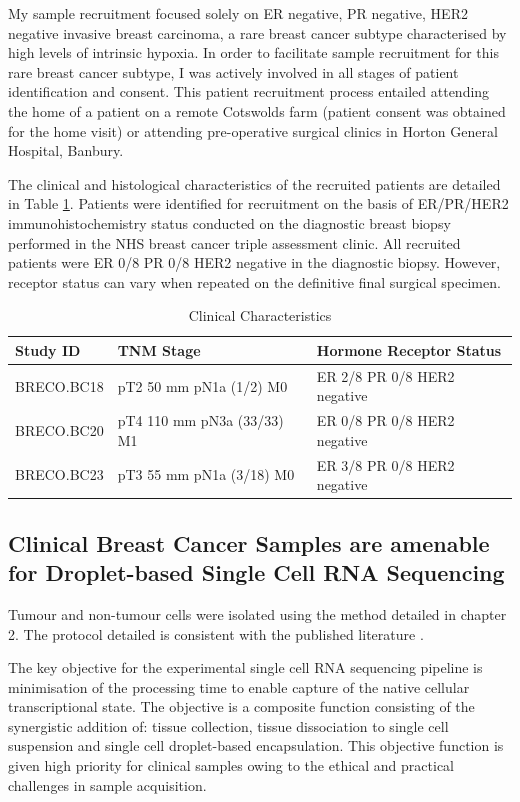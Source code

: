 My sample recruitment focused solely on ER negative, PR negative, HER2 negative invasive breast carcinoma, a rare breast cancer subtype characterised by high levels of intrinsic hypoxia. In order to facilitate sample recruitment for this rare breast cancer subtype, I was actively involved in all stages of patient identification and consent. This patient recruitment process entailed attending the home of a patient on a remote Cotswolds farm (patient consent was obtained for the home visit) or attending pre-operative surgical clinics in Horton General Hospital, Banbury.


The clinical and histological characteristics of the recruited patients are detailed in Table \ref{tab: clinical_characteristics}. Patients were identified for recruitment on the basis of ER/PR/HER2 immunohistochemistry status conducted on the diagnostic breast biopsy performed in the NHS breast cancer triple assessment clinic. All recruited patients were ER 0/8 PR 0/8 HER2 negative in the diagnostic biopsy. However, receptor status can vary when repeated on the definitive final surgical specimen.

\begin{table}
	\centering
	\begin{tabular}{l | l | l}
		Study ID & TNM Stage & Hormone Receptor Status \\
		\hline
		BRECO.BC18 & pT2 50 mm pN1a (1/2) M0 & ER 2/8 PR 0/8 HER2 negative \\
		BRECO.BC20 & pT4 110 mm pN3a (33/33) M1 & ER 0/8 PR 0/8 HER2 negative \\
		BRECO.BC23 & pT3 55 mm pN1a (3/18) M0 & ER 3/8 PR 0/8 HER2 negative \\
		\hline
	\end{tabular}
	\caption{Clinical Characteristics}
	\label{tab: clinical_characteristics}
\end{table}

\subsection{Clinical Breast Cancer Samples are amenable for Droplet-based Single Cell RNA Sequencing}
Tumour and non-tumour cells were isolated using the method detailed in chapter 2. The protocol detailed is consistent with the published literature \cite{Bassez2021}.

The key objective for the experimental single cell RNA sequencing pipeline is minimisation of the processing time to enable capture of the native cellular transcriptional state. The objective is a composite function consisting of the synergistic addition of: tissue collection, tissue dissociation to single cell suspension and single cell droplet-based encapsulation. This objective function is given high priority for clinical samples owing to the ethical and practical challenges in sample acquisition.

